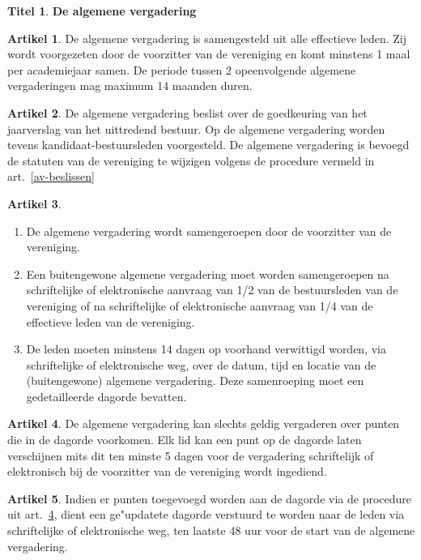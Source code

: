 \documentclass[a4paper,10pt]{article}
\theoremstyle{definition}
\newtheorem{titel}{\newline\Large Titel}
\newtheorem{artikelbase}{\large Artikel}
\newenvironment{artikel}
  {\begin{artikelbase}}
  {\smallskip
   \end{artikelbase}}
\newcommand{\ttext}[1]{\Large \textbf{#1} \normalsize}
\newcommand{\ttextcr}{\hfill\newline}
\newcommand{\ttextenum}{\mbox{}}
\begin{document}
\begin{titel}\ttext{De algemene vergadering}

  \begin{artikel}\ttextcr
    De algemene vergadering is samengesteld uit alle effectieve leden.
    Zij wordt voorgezeten door de voorzitter van de vereniging en komt minstens 1 maal per academiejaar samen.
    De periode tussen 2 opeenvolgende algemene vergaderingen mag maximum 14 maanden duren.
  \end{artikel}

  \begin{artikel}\ttextcr
    De algemene vergadering beslist over de goedkeuring van het jaarverslag van het uittredend bestuur.
    Op de algemene vergadering worden tevens kandidaat-bestuursleden voorgesteld.
    De algemene vergadering is bevoegd de statuten van de vereniging te wijzigen volgens de procedure vermeld in art.~\ref{av-beslissen}
  \end{artikel}

  \begin{artikel}\label{av-samenroeping}\ttextenum
    \begin{enumerate}
      \item
        De algemene vergadering wordt samengeroepen door de voorzitter van de vereniging.
      \item
        Een buitengewone algemene vergadering moet worden samengeroepen na schriftelijke of elektronische aanvraag van 1/2 van de bestuursleden van de vereniging of na schriftelijke of elektronische aanvraag van 1/4 van de effectieve leden van de vereniging.
      \item
        De leden moeten minstens 14 dagen op voorhand verwittigd worden, via schriftelijke of elektronische weg, over de datum, tijd en locatie van de (buitengewone) algemene vergadering.
        Deze samenroeping moet een gedetailleerde dagorde bevatten.
    \end{enumerate}
  \end{artikel}

  \begin{artikel}\label{av-dagorde}\ttextcr
    De algemene vergadering kan slechts geldig vergaderen over punten die in de dagorde voorkomen.
    Elk lid kan een punt op de dagorde laten verschijnen mits dit ten minste 5 dagen voor de vergadering schriftelijk of elektronisch bij de voorzitter van de vereniging wordt ingediend.
  \end{artikel}

  \begin{artikel}\ttextcr
    Indien er punten toegevoegd worden aan de dagorde via de procedure uit art.~\ref{av-dagorde}, dient een ge"updatete dagorde verstuurd te worden naar de leden via schriftelijke of elektronische weg, ten laatste 48 uur voor de start van de algemene vergadering.
  \end{artikel}


\end{titel}
\end{document}
